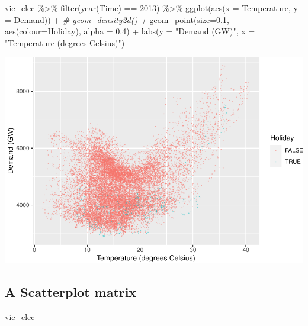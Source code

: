 \documentclass[
]{book}
\newenvironment{Shaded}{\begin{snugshade}}{\end{snugshade}}
\newcommand{\AttributeTok}[1]{\textcolor[rgb]{0.77,0.63,0.00}{#1}}
\newcommand{\CommentTok}[1]{\textcolor[rgb]{0.56,0.35,0.01}{\textit{#1}}}
\newcommand{\DecValTok}[1]{\textcolor[rgb]{0.00,0.00,0.81}{#1}}
\newcommand{\FloatTok}[1]{\textcolor[rgb]{0.00,0.00,0.81}{#1}}
\newcommand{\FunctionTok}[1]{\textcolor[rgb]{0.00,0.00,0.00}{#1}}
\newcommand{\NormalTok}[1]{#1}
\newcommand{\SpecialCharTok}[1]{\textcolor[rgb]{0.00,0.00,0.00}{#1}}
\newcommand{\StringTok}[1]{\textcolor[rgb]{0.31,0.60,0.02}{#1}}
\begin{document}
\begin{Shaded}
\begin{Highlighting}[]
\NormalTok{vic\_elec }\SpecialCharTok{\%\textgreater{}\%}
  \FunctionTok{filter}\NormalTok{(}\FunctionTok{year}\NormalTok{(Time) }\SpecialCharTok{==} \DecValTok{2013}\NormalTok{) }\SpecialCharTok{\%\textgreater{}\%}
  \FunctionTok{ggplot}\NormalTok{(}\FunctionTok{aes}\NormalTok{(}\AttributeTok{x =}\NormalTok{ Temperature, }\AttributeTok{y =}\NormalTok{ Demand)) }\SpecialCharTok{+}
\CommentTok{\#  geom\_density2d() +}
  \FunctionTok{geom\_point}\NormalTok{(}\AttributeTok{size=}\FloatTok{0.1}\NormalTok{, }\FunctionTok{aes}\NormalTok{(}\AttributeTok{colour=}\NormalTok{Holiday), }\AttributeTok{alpha =} \FloatTok{0.4}\NormalTok{) }\SpecialCharTok{+}
  \FunctionTok{labs}\NormalTok{(}\AttributeTok{y =} \StringTok{"Demand (GW)"}\NormalTok{, }\AttributeTok{x =} \StringTok{"Temperature (degrees Celsius)"}\NormalTok{)}
\end{Highlighting}
\end{Shaded}

\includegraphics{graphics/unnamed-chunk-21-1.pdf}

\hypertarget{a-scatterplot-matrix}{%
\subsection{A Scatterplot matrix}\label{a-scatterplot-matrix}}

\begin{Shaded}
\begin{Highlighting}[]
\NormalTok{vic\_elec}
\end{Highlighting}
\end{Shaded}
\end{document}
